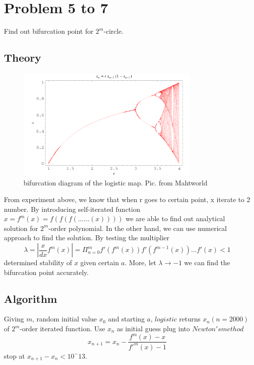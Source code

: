 \documentclass[12pt]{article}
\begin{document}
\section{Problem 5 to 7}
Find out bifurcation point for $2^m$-circle.  

\subsection{Theory}
\begin{figure}[h!]
	\begin{center}
		\includegraphics[width=0.8\textwidth]{logistic_map.png}
		\caption{bifurcation diagram of the logistic map. Pic. from Mahtworld}
		\label{fig1}
	\end{center}
\end{figure}
From experiment above, we know that when r goes to certain point, x iterate to 2 number. By introducing self-iterated function $x=f^m(x)=f(f(f(......(x))))$ we are able to find out analytical solution for $2^m$-order polynomial. In the other hand, we can use numerical approach to find the solution. By testing the multiplier
\begin{equation}
	\lambda=|\frac{x}{dx}f^m(x)|=\Pi^m_{n=0}f'(f^m(x))f'(f^{m-1}(x))...f'(x)<1
\end{equation} 
determined stability of $x$ given certain $a$. More, let $\lambda\rightarrow-1$ we can find the bifurcation point accurately.

\subsection{Algorithm}
Giving $m$, random initial value $x_0$ and starting $a$, $logistic$ returns $x_n (n=2000)$ of $2^m$-order iterated function. Use $x_n$ as initial guess plug into $Newton's method$
\begin{equation}
	x_{n+1}=x_n-\frac{f^m(x)-x}{f'^m(x)-1}
\end{equation}
stop at $x_{n+1}-x_n<10^-13$.
\end{document}
